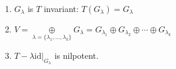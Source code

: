 \documentclass[11pt,fleqn]{book} %
\begin{document}
\begin{theorem}
$\text{ }$
 
    \begin{enumerate}[label=\alph*)]
        \item $G_\lambda$ is $T$ invariant: $T(G_\lambda) = G_\lambda$
         
        \item $V = \underset{\lambda = \{ \lambda_1, \dots, \lambda_k \}}{\oplus} G_{\lambda} = G_{\lambda_1} \oplus G_{\lambda_2} \oplus \cdots \oplus G_{\lambda_k}$
         
        \item $T - \lambda\mathrm{id} \big|_{G_\lambda}$ is nilpotent. 
    \end{enumerate}
\end{theorem}
 
\end{document}

